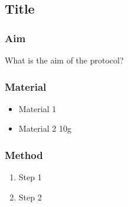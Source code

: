 \subsection{Title}
\label{sec:TITLE}
\subsubsection*{Aim}
What is the aim of the protocol? 
\subsubsection*{Material}

\begin{itemize}
    \item Material 1
    \item Material 2 10g
\end{itemize}

\subsubsection*{Method}
\begin{enumerate}
    \item Step 1
    \item Step 2
\end{enumerate}

\newpage